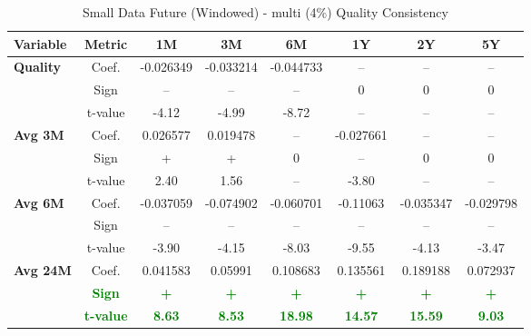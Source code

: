 \documentclass[11pt,english,a4paper,hidelinks]{book}
\begin{document}
\begin{table}[H]
    \centering
    \caption{Small Data Future (Windowed) - \acrshort{multi} (4\%) Quality Consistency}
    \begin{tabular}{lccccccc}
        \toprule
        \textbf{Variable} & \textbf{Metric} & \textbf{1M} & \textbf{3M} & \textbf{6M} & \textbf{1Y} & \textbf{2Y} & \textbf{5Y} \\
        \midrule
        \multirow{3}{*}{\textbf{Quality}}
            & Coef.   & -0.026349 & -0.033214 & -0.044733 & --        & --        & --        \\
            & Sign    & –         & –         & –         & 0         & 0         & 0         \\
            & t-value & -4.12     & -4.99     & -8.72     & --        & --        & --        \\
        \cmidrule{1-8}
        \multirow{3}{*}{\textbf{Avg 3M}}
            & Coef.   & 0.026577  & 0.019478  & --        & -0.027661 & --        & --        \\
            & Sign    & +         & +         & 0         & –         & 0         & 0         \\
            & t-value & 2.40      & 1.56      & --        & -3.80     & --        & --        \\
        \cmidrule{1-8}
        \multirow{3}{*}{\textbf{Avg 6M}}
            & Coef.   & -0.037059 & -0.074902 & -0.060701 & -0.11063  & -0.035347 & -0.029798 \\
            & Sign    & –         & –         & –         & –         & –         & –         \\
            & t-value & -3.90     & -4.15     & -8.03     & -9.55     & -4.13     & -3.47     \\
        \cmidrule{1-8}
        \multirow{3}{*}{\textbf{Avg 24M}}
            & Coef.   & 0.041583  & 0.05991   & 0.108683  & 0.135561  & 0.189188  & 0.072937  \\
            & \textbf{\textcolor{green}{Sign}}
                     & \textbf{\textcolor{green}{+}}
                     & \textbf{\textcolor{green}{+}}
                     & \textbf{\textcolor{green}{+}}
                     & \textbf{\textcolor{green}{+}}
                     & \textbf{\textcolor{green}{+}}
                     & \textbf{\textcolor{green}{+}} \\
            & \textbf{\textcolor{green}{t-value}}
                     & \textbf{\textcolor{green}{8.63}}
                     & \textbf{\textcolor{green}{8.53}}
                     & \textbf{\textcolor{green}{18.98}}
                     & \textbf{\textcolor{green}{14.57}}
                     & \textbf{\textcolor{green}{15.59}}
                     & \textbf{\textcolor{green}{9.03}} \\
        
        \bottomrule
    \end{tabular}
    \label{tab:quality_windowed_reformat}
\end{table}
\end{document}
